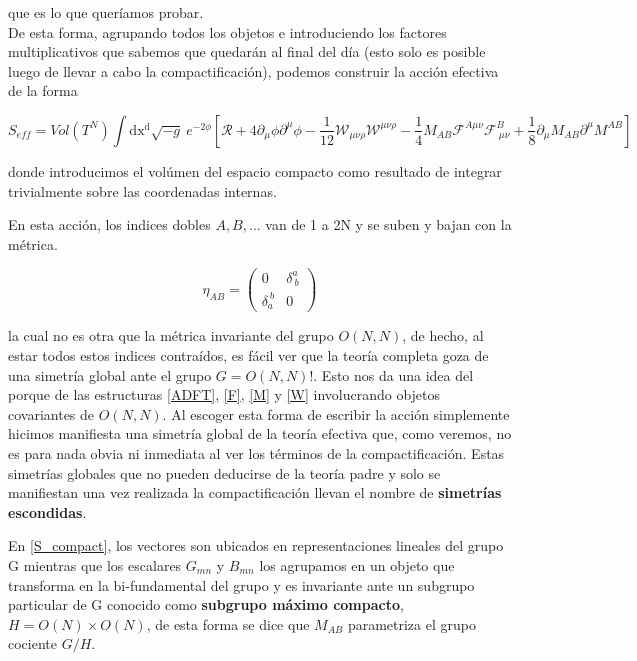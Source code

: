 \documentclass{article}
\numberwithin{equation}{section}
\begin{document}
que es lo que queríamos probar.\\


De esta forma, agrupando todos los objetos e introduciendo los factores multiplicativos que sabemos que quedarán al final del día (esto solo es posible luego de llevar a cabo la compactificación), podemos construir la acción efectiva de la forma


\begin{boxquation}
\begin{equation}\label{S_compact}
S_{eff}= Vol(T^N) \int\mathrm{dx^d} \sqrt{-g} \ e^{-2\phi}\left[ \mathcal{R} + 4 \partial_{\mu}\phi\partial^{\mu} \phi - \frac{1}{12} \mathcal{W}_{\mu \nu \rho} \mathcal{W}^{\mu \nu \rho} -\frac{1}{4} M_{A B} \mathcal{F}^{A \mu \nu} \mathcal{F}^B_{\ \mu \nu} + \frac{1}{8} \partial_{\mu} M_{A B} \partial^{\mu} M^{A B}\right] 
\end{equation}
\end{boxquation}


donde introducimos el volúmen del espacio compacto como resultado de integrar trivialmente sobre las coordenadas internas.

En esta acción, los indices dobles $ A,B,... $ van de 1 a 2N y se suben y bajan con la métrica.

\begin{equation}\label{eta}
\eta_{A B} = \begin{pmatrix}
0 & \delta^a_{\ b}\\
\delta_a^{\ b} & 0
\end{pmatrix}
\end{equation}

la cual no es otra que la métrica invariante del grupo $ O(N,N) $, de hecho, al estar todos estos indices contraídos, es fácil ver que la teoría completa goza de una simetría global ante el grupo $ G= O(N,N) $!. Esto nos da una idea del porque de las estructuras \ref{ADFT}, \ref{F}, \ref{M} y \ref{W} involucrando objetos covariantes de $ O(N,N) $. Al escoger esta forma de escribir la acción simplemente hicimos manifiesta una simetría global de la teoría efectiva que, como veremos, no es para nada obvia ni inmediata al ver los términos de la compactificación. Estas simetrías globales que no pueden deducirse de la teoría padre y solo se manifiestan una vez realizada la compactificación llevan el nombre de \textbf{simetrías escondidas}.

En \ref{S_compact}, los vectores son ubicados en representaciones lineales del grupo G mientras que los escalares $ G_{m n} $ y $ B_{m n} $ los agrupamos en un objeto que transforma en la bi-fundamental del grupo y es invariante ante un subgrupo particular de G conocido como \textbf{subgrupo máximo compacto}, $ H= O(N) \times O(N) $, de esta forma se dice que $ M_{A B} $ parametriza el grupo cociente $ G/H $.\\
\end{document}
